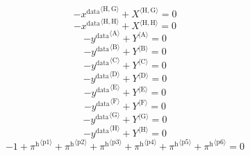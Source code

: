 \begin{equation}
-{x^{\mathrm{data}}}^{\langle \mathrm{\mathrm{H}},\mathrm{\mathrm{G}}\rangle} + {X}^{\langle \mathrm{H},\mathrm{G}\rangle} = 0
\end{equation}
\begin{equation}
-{x^{\mathrm{data}}}^{\langle \mathrm{\mathrm{H}},\mathrm{\mathrm{H}}\rangle} + {X}^{\langle \mathrm{H},\mathrm{H}\rangle} = 0
\end{equation}
\begin{equation}
-{y^{\mathrm{data}}}^{\langle \mathrm{\mathrm{A}}\rangle} + {Y}^{\langle \mathrm{A}\rangle} = 0
\end{equation}
\begin{equation}
-{y^{\mathrm{data}}}^{\langle \mathrm{\mathrm{B}}\rangle} + {Y}^{\langle \mathrm{B}\rangle} = 0
\end{equation}
\begin{equation}
-{y^{\mathrm{data}}}^{\langle \mathrm{\mathrm{C}}\rangle} + {Y}^{\langle \mathrm{C}\rangle} = 0
\end{equation}
\begin{equation}
-{y^{\mathrm{data}}}^{\langle \mathrm{\mathrm{D}}\rangle} + {Y}^{\langle \mathrm{D}\rangle} = 0
\end{equation}
\begin{equation}
-{y^{\mathrm{data}}}^{\langle \mathrm{\mathrm{E}}\rangle} + {Y}^{\langle \mathrm{E}\rangle} = 0
\end{equation}
\begin{equation}
-{y^{\mathrm{data}}}^{\langle \mathrm{\mathrm{F}}\rangle} + {Y}^{\langle \mathrm{F}\rangle} = 0
\end{equation}
\begin{equation}
-{y^{\mathrm{data}}}^{\langle \mathrm{\mathrm{G}}\rangle} + {Y}^{\langle \mathrm{G}\rangle} = 0
\end{equation}
\begin{equation}
-{y^{\mathrm{data}}}^{\langle \mathrm{\mathrm{H}}\rangle} + {Y}^{\langle \mathrm{H}\rangle} = 0
\end{equation}
\begin{equation}
-1 + {\pi^{\mathrm{h}}}^{\langle \mathrm{\mathrm{p1}}\rangle} + {\pi^{\mathrm{h}}}^{\langle \mathrm{\mathrm{p2}}\rangle} + {\pi^{\mathrm{h}}}^{\langle \mathrm{\mathrm{p3}}\rangle} + {\pi^{\mathrm{h}}}^{\langle \mathrm{\mathrm{p4}}\rangle} + {\pi^{\mathrm{h}}}^{\langle \mathrm{\mathrm{p5}}\rangle} + {\pi^{\mathrm{h}}}^{\langle \mathrm{\mathrm{p6}}\rangle} = 0
\end{equation}
